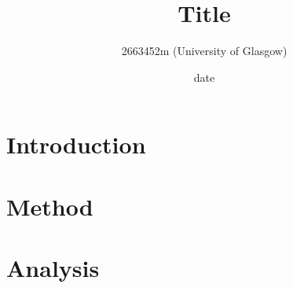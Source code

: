 \documentclass[]{article}
\title{\textbf{Title}}
\author{2663452m (University of Glasgow)}
\date{date}
\begin{document}
\maketitle

\begin{abstract}
\end{abstract}
\newpage





\section*{Introduction}

\section*{}




\section*{Method}





\section*{Analysis}




\newpage
\end{document}
